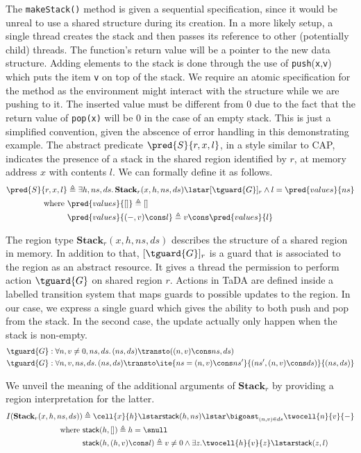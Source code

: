 The \texttt{makeStack()} method is given a sequential specification, since it would be unreal to use a shared structure during its creation. In a more likely setup, a single thread creates the stack and then passes its reference to other (potentially child) threads. The function's return value will be a pointer to the new data structure. Adding elements to the stack is done through the use of \texttt{push}(\texttt{x},\texttt{v}) which puts the item \texttt{v} on top of the stack. We require an atomic specification for the method as the environment might interact with the structure while we are pushing to it. The inserted value must be different from $0$ due to the fact that the return value of \texttt{pop(x)} will be $0$ in the case of an empty stack. This is just a simplified convention, given the abscence of error handling in this demonstrating example. The abstract predicate $\pred{S}{r, x, l}$, in a style similar to CAP, indicates the presence of a stack in the shared region identified by $r$, at memory address $x$ with contents $l$. We can formally define it as follows.
\begin{align*}
\pred{S}{r, x, l} &\triangleq \exists h, ns, ds \ldotp \textbf{Stack}_r(x, h, ns, ds) \lstar [\tguard{G}]_r \land l = \pred{values}{ns}
\\
\text{where } &\pred{values}{[]} \triangleq []
\\
&\pred{values}{(-, v) \cons l} \triangleq v \cons \pred{values}{l}
\end{align*}

The region type $\textbf{Stack}_r(x, h, ns, ds)$ describes the structure of a shared region in memory. In addition to that, $[\tguard{G}]_r$ is a guard that is associated to the region as an abstract resource. It gives a thread the permission to perform action $\tguard{G}$ on shared region $r$. Actions in TaDA are defined inside a labelled transition system that maps guards to possible updates to the region. In our case, we express a single guard which gives the ability to both push and pop from the stack. In the second case, the update actually only happen when the stack is non-empty.
\begin{align*}
&\tguard{G}: \forall n, v \neq 0, ns, ds \ldotp (ns, ds) \transto ((n, v) \cons ns, ds)
\\
&\tguard{G}: \forall n, v, ns, ds \ldotp (ns, ds) \transto \ite{ns = (n, v) \cons ns'}{(ns', (n, v) \cons ds)}{(ns, ds)}
\end{align*}

We unveil the meaning of the additional arguments of $\textbf{Stack}_r$ by providing a region interpretation for the latter.
\begin{align*}
I(\textbf{Stack}_r(x, h, ns, ds)) &\triangleq \cell{x}{h} \lstar \mathsf{stack}(h, ns) \lstar \bigoast_{(n, v) \in ds} \twocell{n}{v}{-}
\\
\text{where } &\mathsf{stack}(h, []) \triangleq h = \snull
\\
&\mathsf{stack}(h, (h, v) \cons l) \triangleq v \neq 0 \land \exists z . \twocell{h}{v}{z} \lstar \mathsf{stack}(z, l)
\end{align*}

